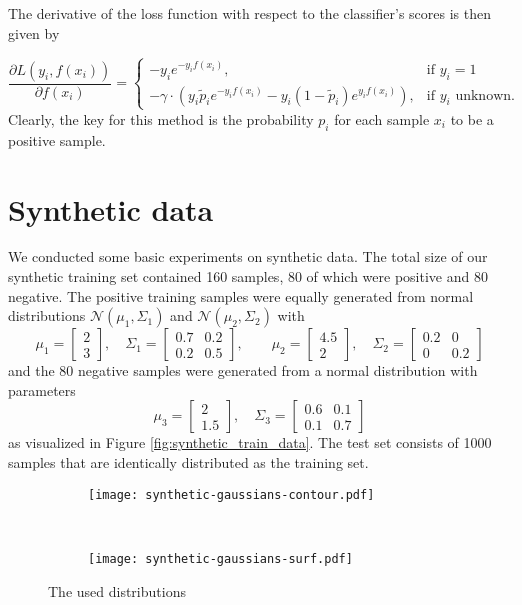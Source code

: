 The derivative of the loss function with respect to the classifier's scores is then given by 

\begin{equation*}
 \frac{\partial L(y_i,f(x_i))}{\partial f(x_i)} = 
    \begin{cases}
	-y_i e^{-y_i f(x_i)}, & \text{if $y_i = 1$}\\
	-\gamma \cdot \left(y_i \tilde p_i e^{-y_i f(x_i)} - y_i (1 - \tilde p_i) e^{y_i f(x_i)} \right), & \text{if $y_i$ unknown.}
      \end{cases}
\end{equation*}
Clearly, the key for this method is the probability $p_i$ for each sample $x_i$ to be a positive sample. 

\section{Synthetic data}
We conducted some basic experiments on synthetic data. 
The total size of our synthetic training set contained 160 samples, 80 of which were positive and 80 negative. 
The positive training samples were equally generated from normal distributions $\mathcal{N}(\mu_1,\Sigma_1)$ and $\mathcal{N}(\mu_2, \Sigma_2)$ with 
$$\mu_1= \begin{bmatrix}2 \\ 3 \end{bmatrix}, \quad \Sigma_1 = \begin{bmatrix}0.7 & 0.2 \\ 0.2 & 0.5 \end{bmatrix}, \qquad \mu_2 = \begin{bmatrix}4.5 \\ 2 \end{bmatrix}, \quad \Sigma_2 = \begin{bmatrix} 0.2 & 0 \\ 0 & 0.2 \end{bmatrix}$$
and the 80 negative samples were generated from a normal distribution with parameters 
$$\mu_3 = \begin{bmatrix} 2\\1.5\end{bmatrix}, \quad \Sigma_3 = \begin{bmatrix}0.6 & 0.1\\ 0.1 & 0.7\end{bmatrix}$$
as visualized in Figure \ref{fig:synthetic_train_data}. The test set consists of 1000 samples that are identically distributed as the training set.
\begin{figure}[ht]
	\centering
	\begin{subfigure}[h]{0.45\textwidth}
	\texttt{[image: synthetic-gaussians-contour.pdf]}	
	\end{subfigure}
	~
	\begin{subfigure}[h]{0.45\textwidth}
	\texttt{[image: synthetic-gaussians-surf.pdf]}	
	\end{subfigure}
	\caption{The used distributions}
	\label{fig:synthetic-gaussians}
\end{figure}

